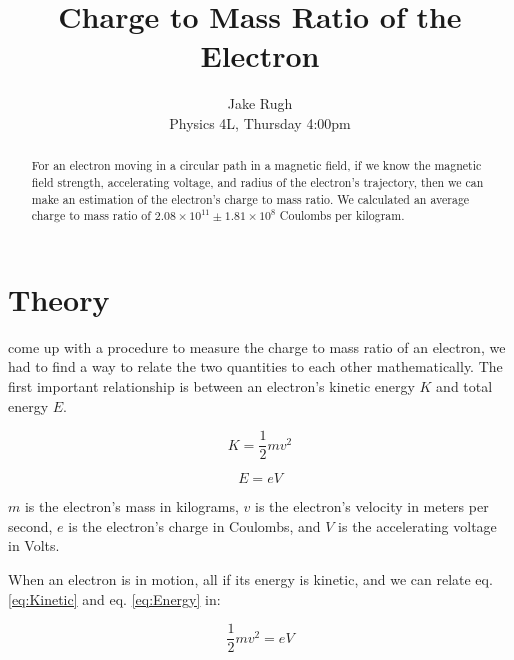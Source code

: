 \documentclass[journal, a4paper]{IEEEtran}
\begin{document}
	\title{Charge to Mass Ratio of the Electron}
	\author{Jake Rugh \\ Physics 4L, Thursday 4:00pm}
	\maketitle

\begin{abstract}
	For an electron moving in a circular path in a magnetic field, if we know the magnetic field strength, accelerating voltage, and radius of the electron's trajectory, then we can make an estimation of the electron's charge to mass ratio. We calculated an average charge to mass ratio of $2.08 \times 10^{11} \pm 1.81 \times 10^8$ Coulombs per kilogram.
\end{abstract}

\section{Theory}
	 come up with a procedure to measure the charge to mass ratio of an electron, we had to find a way to relate the two quantities to each other mathematically. The first important relationship is between an electron's kinetic energy $K$ and total energy $E$.
    
    \begin{equation} \label{eq:Kinetic} %
K=\frac{1}{2}mv^2
\end{equation}

    \begin{equation} \label{eq:Energy} %
E=eV
\end{equation}

	$m$ is the electron's mass in kilograms, $v$ is the electron's velocity in meters per second, $e$ is the electron's charge in Coulombs, and $V$ is the accelerating voltage in Volts.

	When an electron is in motion, all if its energy is kinetic, and we can relate eq. \ref{eq:Kinetic} and eq. \ref{eq:Energy} in:

	\begin{equation} \label{eq:KtoE} %
\frac{1}{2}mv^2=eV
\end{equation}
\end{document}
